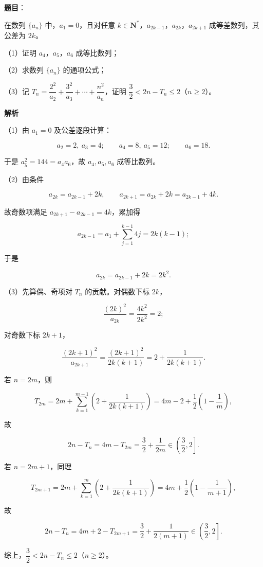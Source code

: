 \begin{answer}

\textbf{题目}：

在数列 $\{a_n\}$ 中，$a_1=0$，且对任意 $k\in\mathbf N^*$，$a_{2k-1}$，$a_{2k}$，$a_{2k+1}$ 成等差数列，其公差为 $2k$。

（1）证明 $a_4$，$a_5$，$a_6$ 成等比数列；

（2）求数列 $\{a_n\}$ 的通项公式；

（3）记 $T_n=\dfrac{2^2}{a_2}+\dfrac{3^2}{a_3}+\cdots+\dfrac{n^2}{a_n}$，证明 $\dfrac32<2n-T_n\leqslant2$（$n\geqslant2$）。

\textbf{解析}

（1）由 $a_1=0$ 及公差逐段计算：

\nopagebreak[4]
\[a_2=2,\ a_3=4;\qquad a_4=8,\ a_5=12;\qquad a_6=18.\]

于是 $a_5^2=144=a_4a_6$，故 $a_4,a_5,a_6$ 成等比数列。

（2）由条件

\nopagebreak[4]
\[a_{2k}=a_{2k-1}+2k,\qquad a_{2k+1}=a_{2k}+2k=a_{2k-1}+4k.\]

故奇数项满足 $a_{2k+1}-a_{2k-1}=4k$，累加得

\nopagebreak[4]
\[a_{2k-1}=a_1+\sum_{j=1}^{k-1}4j=2k(k-1);\]

于是

\nopagebreak[4]
\[a_{2k}=a_{2k-1}+2k=2k^2.\]

（3）先算偶、奇项对 $T_n$ 的贡献。对偶数下标 $2k$，

\nopagebreak[4]
\[\frac{(2k)^2}{a_{2k}}=\frac{4k^2}{2k^2}=2;\]

对奇数下标 $2k+1$，

\nopagebreak[4]
\[\frac{(2k+1)^2}{a_{2k+1}}
=\frac{(2k+1)^2}{2k(k+1)}
=2+\frac1{2k(k+1)}.\]

若 $n=2m$，则

\nopagebreak[4]
\[T_{2m}=2m+\sum_{k=1}^{m-1}\left(2+\frac1{2k(k+1)}\right)
=4m-2+\frac12\left(1-\frac1m\right),\]

故

\nopagebreak[4]
\[2n-T_n=4m-T_{2m}=\frac32+\frac1{2m}\in\left(\frac32,2\right].\]

若 $n=2m+1$，同理

\nopagebreak[4]
\[T_{2m+1}=2m+\sum_{k=1}^{m}\left(2+\frac1{2k(k+1)}\right)
=4m+\frac12\left(1-\frac1{m+1}\right),\]

故

\nopagebreak[4]
\[2n-T_n=4m+2-T_{2m+1}
=\frac32+\frac1{2(m+1)}\in\left(\frac32,2\right].\]

综上，$\dfrac32<2n-T_n\leqslant2$（$n\geqslant2$）。


\end{answer}